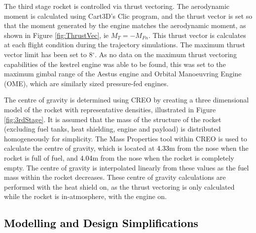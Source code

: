 		The third stage rocket is controlled via thrust vectoring. The aerodynamic moment is calculated using Cart3D's Clic program, and the thrust vector is set so that the moment generated by the engine matches the aerodynamic moment, as shown in Figure \ref{fig:ThrustVec}, ie $M_{T} = -M_{Fn}$. This thrust vector is calculates at each flight condition during the trajectory simulations. The maximum thrust vector limit has been set to 8$^\circ$. As no data on the maximum thrust vectoring capabilities of the kestrel engine was able to be found, this was set to the maximum gimbal range of the Aestus engine and Orbital Manoeuvring Engine (OME), which are similarly sized pressure-fed engines\cite{Wade2017}.
		
		The centre of gravity is determined using CREO by creating a three dimensional model of the rocket with representative densities, illustrated in Figure \ref{fig:3rdStage}. It is assumed that the mass of the structure of the rocket (excluding fuel tanks, heat shielding, engine and payload) is distributed homogeneously for simplicity. The Mass Properties tool within CREO is used to calculate the centre of gravity, which is located at \textcolor{black}{4.33}m from the nose when the rocket is full of fuel, and \textcolor{black}{4.04}m from the nose when the rocket is completely empty. The centre of gravity is interpolated linearly from these values as the fuel mass within the rocket decreases. These centre of gravity calculations are performed with the heat shield on, as the thrust vectoring is only calculated while the rocket is in-atmosphere, with the engine on. 
		
	
		

\textcolor{black}{
\section{Modelling and Design Simplifications}\label{sec:simpl} 
}

